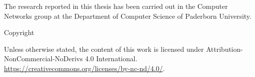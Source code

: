 \thispagestyle{empty}

\thetitle{}

\theauthor{}

The research reported in this thesis has been carried out in the Computer Networks group at the Department of Computer Science of Paderborn University. 

\vspace*{\fill}

Copyright \textcopyright \the\year{} \theauthor{}

\ccbyncndeu 

Unless otherwise stated, the content of this work is licensed under Attribution-NonCommercial-NoDerivs 4.0 International. \href{https://creativecommons.org/licenses/by-nc-nd/4.0/}{https://creativecommons.org/licenses/by-nc-nd/4.0/}.